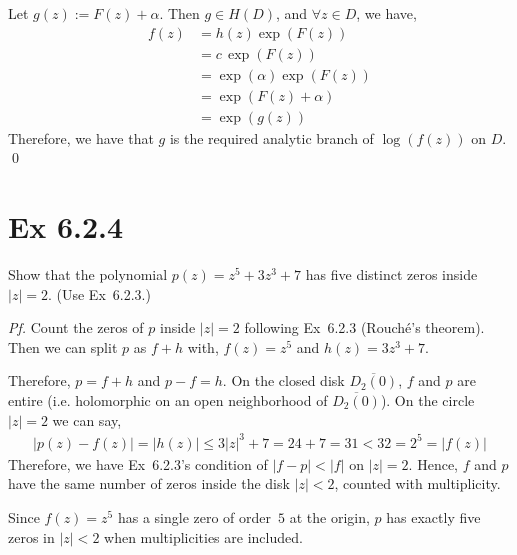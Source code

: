 \documentclass[a4paper]{article}
\begin{document}
\medskip
Let $g(z):=F(z)+\alpha$. Then $g\in H(D)$, and $\forall z\in D$, we have,
\begin{align*}
  f(z) &=h(z)\exp(F(z)) \\
  &=c\,\exp(F(z)) \\
  &=\exp(\alpha)\exp(F(z)) \\
  &=\exp(F(z)+\alpha) \\
  &=\exp(g(z))
\end{align*}
Therefore, we have that $g$ is the required analytic branch of $\log(f(z))$ on $D$. \qed

\newpage

\section*{Ex 6.2.4}

\begin{tcolorbox}[colback=gray!10, colframe=black, boxrule=0.5pt, arc=2mm]
Show that the polynomial $p(z)=z^{5}+3z^{3}+7$ has five distinct zeros inside $|z|=2$. (Use Ex~6.2.3.)
\end{tcolorbox}

\textit{Pf.} Count the zeros of $p$ inside $|z|=2$ following Ex~6.2.3 (Rouch\'e's theorem). Then we can split $p$ as $f+h$ with, $f(z)=z^{5}$ and $h(z)=3z^{3}+7$. 

\medskip
Therefore, $p=f+h$ and $p-f=h$. On the closed disk $\overline{D_{2}(0)}$, $f$ and $p$ are entire (i.e. holomorphic on an open neighborhood of $\overline{D_{2}(0)}$). On the circle $|z|=2$ we can say,
\begin{align*}
  |p(z)-f(z)| =|h(z)|\le 3|z|^{3}+7 =24+7=31<32=2^{5}=|f(z)|
\end{align*}
Therefore, we have Ex~6.2.3's condition of $|f-p|<|f|$ on $|z|=2$. Hence, $f$ and $p$ have the same number of zeros inside the disk $|z|<2$, counted with multiplicity. 

Since $f(z)=z^{5}$ has a single zero of order~$5$ at the origin, $p$ has exactly five zeros in $|z|<2$ when multiplicities are included.
\end{document}
